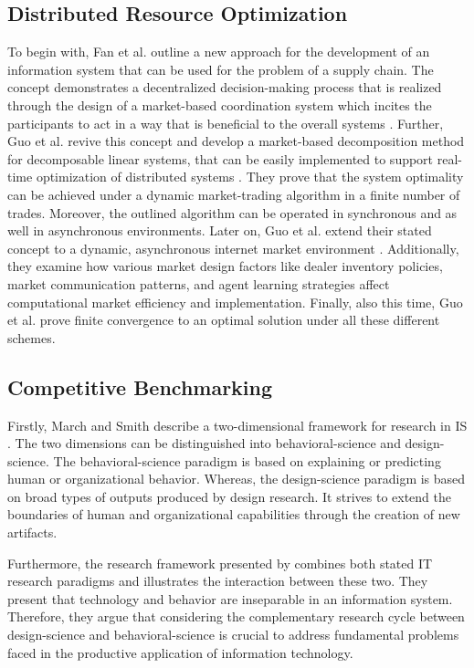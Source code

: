 \subsection{Distributed Resource Optimization}
\label{sec:Distributed Resource Optimization}
To begin with, Fan et al. outline a new approach for the development of an information system
that can be used for the problem of a supply chain. The concept demonstrates a decentralized
decision-making process that is realized through the design of a market-based coordination
system which incites the participants to act in a way that is beneficial to the overall
systems . Further, Guo et al. revive this concept
and develop a market-based decomposition method for decomposable linear systems,
that can be easily implemented to support real-time optimization of distributed
systems . They prove that the system optimality can be
achieved under a dynamic market-trading algorithm in a finite number of trades.
Moreover, the outlined algorithm can be operated in synchronous and as well in
asynchronous environments. Later on, Guo et al. extend their stated concept to a
dynamic, asynchronous internet market environment .
Additionally, they examine how various market design factors like dealer inventory
policies, market communication patterns, and agent learning strategies affect
computational market efficiency and implementation. Finally, also this time,
Guo et al. prove finite convergence to an optimal solution under all these different schemes.

\subsection{Competitive Benchmarking}
Firstly, March and Smith describe a two-dimensional framework for research in IS .
The two dimensions can be distinguished into behavioral-science and design-science. The behavioral-science
paradigm is based on explaining or predicting human or organizational behavior. Whereas, the design-science
paradigm is based on broad types of outputs produced by design research. It strives to extend the boundaries
of human and organizational capabilities through the creation of new artifacts.

Furthermore, the research framework presented by  combines both stated
IT research paradigms and illustrates the interaction between these two.
They present that technology and behavior are inseparable in an information system. Therefore,
they argue that considering the complementary research cycle between design-science and behavioral-science
is crucial to address fundamental problems faced in the productive application of information technology.

